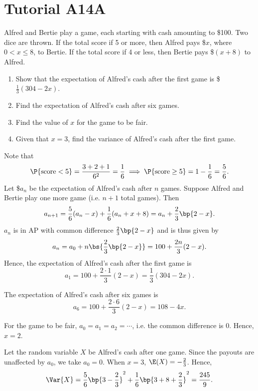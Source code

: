 \section{Tutorial A14A}

\begin{problem}
    Alfred and Bertie play a game, each starting with cash amounting to \$100. Two dice are thrown. If the total score if 5 or more, then Alfred pays \$$x$, where $0 < x \leq 8$, to Bertie. If the total score if 4 or less, then Bertie pays \$$(x+8)$ to Alfred.

    \begin{enumerate}
        \item Show that the expectation of Alfred's cash after the first game is \$$\frac13 (304 - 2x)$.
        \item Find the expectation of Alfred's cash after six games.
        \item Find the value of $x$ for the game to be fair.
        \item Given that $x = 3$, find the variance of Alfred's cash after the first game.
    \end{enumerate}
\end{problem}
\begin{solution}
    \begin{ppart}
        Note that \[\P{\text{score}<5} = \frac{3 + 2 + 1}{6^2} = \frac16 \implies \P{\text{score} \geq 5} = 1 - \frac16 = \frac56.\] Let \$$a_n$ be the expectation of Alfred's cash after $n$ games. Suppose Alfred and Bertie play one more game (i.e. $n + 1$ total games). Then \[a_{n+1} = \frac56 (a_n - x) + \frac16(a_n + x + 8) = a_n + \frac23 \bp{2-x}.\] $a_n$ is in AP with common difference $\frac23 \bp{2-x}$ and is thus given by \[a_n = a_0 + n\bs{\frac23 \bp{2-x}} = 100 + \frac{2n}{3}(2-x).\] Hence, the expectation of Alfred's cash after the first game is \[a_1 = 100 + \frac{2 \cdot 1}3(2 - x) = \frac13(304 - 2x).\]
    \end{ppart}
    \begin{ppart}
        The expectation of Alfred's cash after six games is \[a_6 = 100 + \frac{2 \cdot 6}{3}(2 - x) = 108 - 4x.\]
    \end{ppart}
    \begin{ppart}
        For the game to be fair, $a_0 = a_1 = a_2 = \cdots$, i.e. the common difference is 0. Hence, $x = 2$.
    \end{ppart}
    \begin{ppart}
        Let the random variable $X$ be Alfred's cash after one game. Since the payouts are unaffected by $a_0$, we take $a_0 = 0$. When $x = 3$, $\E(X) = -\frac23$. Hence, \[\Var{X} = \frac56 \bp{3 - \frac23}^2 + \frac16 \bp{3 + 8 + \frac23}^2 = \frac{245}{9}.\]
    \end{ppart}
\end{solution}